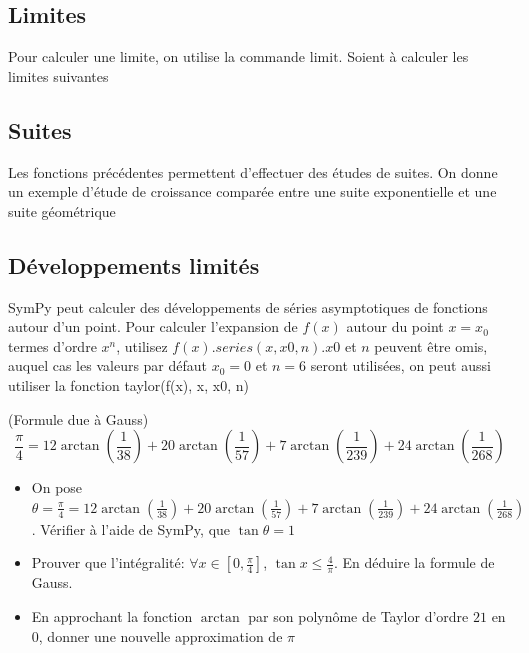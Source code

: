  \subsection{Limites}
Pour calculer une limite, on utilise la commande $\mathrm{limit}$. Soient à calculer les limites suivantes
 \subsection{Suites}
 Les fonctions précédentes permettent d’effectuer des études de suites. On donne un exemple d’étude de croissance comparée entre une suite exponentielle et une suite géométrique
 \subsection{Développements limités}
 SymPy peut calculer des développements de séries asymptotiques de fonctions autour d'un point. Pour calculer 
 l'expansion de $f(x)$ autour du point $x = x_{0}$ termes d'ordre $x^{n}$, utilisez $f(x).series(x, x0, n). x0$ 
 et $n$ peuvent être omis, auquel cas les valeurs par défaut $x_{0} = 0$ et $n = 6$ seront utilisées, on peut 
 aussi utiliser la fonction taylor(f(x), x, x0, n)

\begin{exercise}
 \end{exercise}
 \begin{exercise}(Formule due \`a Gauss)
 \[
 \frac{\pi}{4} = 12\arctan(\frac{1}{38})+20\arctan(\frac{1}{57})+7\arctan(\frac{1}{239})+24\arctan(\frac{1}{268})
 \]
 \begin{itemize}
  \item On pose $\theta = \frac{\pi}{4} = 12\arctan(\frac{1}{38})+20\arctan(\frac{1}{57})+7\arctan(\frac{1}{239})+24\arctan(\frac{1}{268})$. Vérifier à l'aide de SymPy, que $\tan\theta = 1$
  \item Prouver que l'intégralité: $\forall x \in \left[0,\frac{\pi}{4}\right]$, $\tan x \leq \frac{4}{\pi}$. En déduire la formule de Gauss.
  \item En approchant la fonction $\arctan$ par son polynôme de Taylor d’ordre $21$ en $0$, donner une nouvelle approximation de $\pi$
 \end{itemize}
 \end{exercise}
 \begin{exercise}
 \end{exercise}
